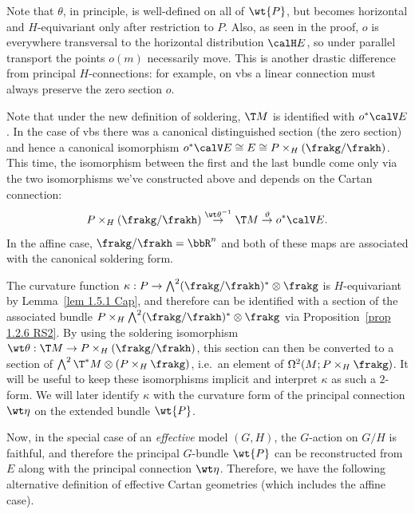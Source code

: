 Note that $\theta$, in principle, is well-defined on all of $\wt{P}$, but becomes horizontal and $H$-equivariant only after restriction to $P$. Also, as seen in the proof, $o$ is everywhere transversal to the horizontal distribution $\calH E$, so under parallel transport the points $o(m)$ necessarily move. This is another drastic difference from principal $H$-connections: for example, on \glspl{vb} a linear connection must always preserve the zero section $o$.

\begin{rem}
    Note that under the new definition of soldering, $\T M$ is identified with $o^\ast \calV E$. In the case of \glspl{vb} there was a canonical distinguished section (the zero section) and hence a canonical isomorphism $o^\ast\calV E\cong E\cong P\times_H (\frakg\slash\frakh)$. This time, the isomorphism between the first and the last bundle come only via the two isomorphisms we've constructed above and depends on the Cartan connection:
    \[P\times_H(\frakg\slash\frakh)\overset{{\wt\theta}^{-1}}{\to}\T M\overset{\vartheta}{\to}o^\ast\calV E.\]
    In the affine case, $\frakg\slash\frakh=\bbR^n$ and both of these maps are associated with the canonical soldering form.
\end{rem}

\begin{rem}
    The curvature function $\kappa:P\to \bigwedge^2(\frakg\slash\frakh)^\ast\otimes\frakg$ is $H$-equivariant by Lemma~\ref{lem 1.5.1 Cap}, and therefore can be identified with a section of the associated bundle $P\times_H \bigwedge^2(\frakg\slash\frakh)^\ast\otimes\frakg$ via Proposition~\ref{prop 1.2.6 RS2}. By using the soldering isomorphism $\wt\theta:\T M\to P\times_H(\frakg\slash\frakh)$, this section can then be converted to a section of $\bigwedge^2\T^\ast M\otimes (P\times_H\frakg)$, i.e.\ an element of $\Omega^2(M;P\times_H\frakg)$. It will be useful to keep these isomorphisms implicit and interpret $\kappa$ as such a $2$-form. We will later identify $\kappa$ with the curvature form of the principal connection $\wt\eta$ on the extended bundle $\wt{P}$.
\end{rem}


Now, in the special case of an \emph{effective} model $(G,H)$, the $G$-action on $G\slash H$ is faithful, and therefore the principal $G$-bundle $\wt{P}$ can be reconstructed from $E$ along with the principal connection $\wt\eta$. Therefore, we have the following alternative definition of effective Cartan geometries (which includes the affine case).

